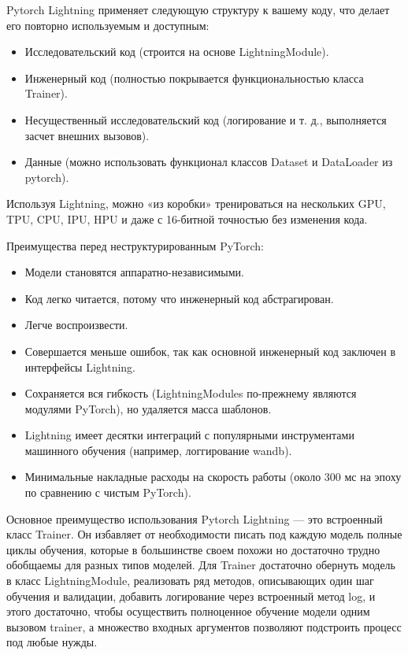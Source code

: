 Pytorch Lightning применяет следующую структуру к вашему коду, что делает его повторно используемым и доступным:

\begin{itemize}
	\item Исследовательский код (строится на основе LightningModule).
	\item Инженерный код (полностью покрывается функциональностью класса Trainer).
	\item Несущественный исследовательский код (логирование и т. д., выполняется засчет внешних вызовов).
	\item Данные (можно использовать функционал классов Dataset и DataLoader из pytorch).
\end{itemize}

Используя Lightning, можно «из коробки» тренироваться на нескольких GPU, TPU, CPU, IPU, HPU и даже с 16-битной точностью без изменения кода.

Преимущества перед неструктурированным PyTorch:

\begin{itemize}
	\item Модели становятся аппаратно-независимыми.
	\item Код легко читается, потому что инженерный код абстрагирован.
	\item Легче воспроизвести.
	\item Совершается меньше ошибок, так как основной инженерный код заключен в интерфейсы Lightning.
	\item Сохраняется вся гибкость (LightningModules по-прежнему являются модулями PyTorch), но удаляется масса шаблонов.
	\item Lightning имеет десятки интеграций с популярными инструментами машинного обучения (например, логгирование wandb).
	\item Минимальные накладные расходы на скорость работы (около 300 мс на эпоху по сравнению с чистым PyTorch).
\end{itemize}

Основное преимущество использования Pytorch Lightning --- это встроенный класс Trainer. Он избавляет от необходимости писать под каждую модель полные циклы обучения, которые в большинстве своем похожи но достаточно трудно обобщаемы для разных типов моделей. Для Trainer достаточно обернуть модель в класс LightningModule, реализовать ряд методов, описывающих один шаг обучения и валидации, добавить логирование через встроенный метод log, и этого достаточно, чтобы осуществить полноценное обучение модели одним вызовом trainer, а множество входных аргументов позволяют подстроить процесс под любые нужды.

